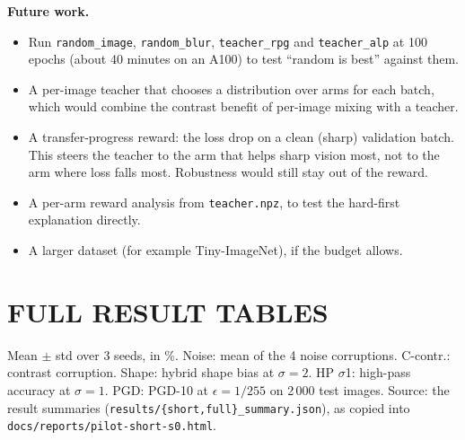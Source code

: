 \documentclass[a4paper,12pt]{report}
\newcommand{\cond}[1]{\texttt{#1}}
\begin{document}
\textbf{Future work.}
\begin{itemize}
\item Run \cond{random\_image}, \cond{random\_blur}, \cond{teacher\_rpg} and \cond{teacher\_alp} at 100 epochs (about 40 minutes on an A100) to test ``random is best'' against them.
\item A per-image teacher that chooses a distribution over arms for each batch, which would combine the contrast benefit of per-image mixing with a teacher.
\item A transfer-progress reward: the loss drop on a clean (sharp) validation batch. This steers the teacher to the arm that helps sharp vision most, not to the arm where loss falls most. Robustness would still stay out of the reward.
\item A per-arm reward analysis from \texttt{teacher.npz}, to test the hard-first explanation directly.
\item A larger dataset (for example Tiny-ImageNet), if the budget allows.
\end{itemize}




\appendix
\chapter{FULL RESULT TABLES}

Mean $\pm$ std over 3 seeds, in \%. Noise: mean of the 4 noise corruptions. C-contr.: contrast corruption. Shape: hybrid shape bias at $\sigma=2$. HP $\sigma$1: high-pass accuracy at $\sigma=1$. PGD: PGD-10 at $\epsilon=1/255$ on 2\,000 test images. Source: the result summaries (\texttt{results/\{short,full\}\_summary.json}), as copied into \texttt{docs/reports/pilot-short-s0.html}.

\begin{table}[htbp]
\caption{All 20 conditions at 30 epochs.}
\label{tab:full30}
\begin{center}
\footnotesize
\setlength{\tabcolsep}{1.6pt}

\end{center}
\end{table}

\begin{table}[htbp]
\caption{The seven main conditions at 100 epochs.}
\label{tab:full100}
\begin{center}
\footnotesize
\setlength{\tabcolsep}{1.6pt}

\end{center}
\end{table}
\end{document}
